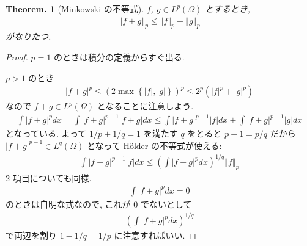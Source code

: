 \documentclass[openany, a4paper, oneside]{jsbook}
\theoremstyle{break}
\newtheorem{thm}{Theorem.}[section]
\theoremstyle{breakdefn}
\newcommand{\abs}[1]{\left|#1\right|}
\newcommand{\norm}[1]{\left\Vert#1\right\Vert}
\newcommand{\rbk}[1]{\left (#1\right)}
\newcommand{\cbk}[1]{\left\{#1\right\}}
\begin{document}
\begin{thm}[Minkowski の不等式]
 $f$, $g \in L^p(\Omega)$ とするとき,
 \begin{align}
  \norm{f + g}_p
  \leq
  \norm{f}_p + \norm{g}_p
 \end{align}
 がなりたつ.
\end{thm}
\begin{proof}
$p=1$ のときは積分の定義からすぐ出る.

$p > 1$ のとき
\begin{align}
 \abs{f + g}^p
 \le
 \rbk{2 \max \cbk{\abs{f}, \abs{g}}}^p
 \le
 2^p \rbk{\abs{f}^p + \abs{g}^p}
\end{align}
なので $f + g \in L^p(\Omega)$ となることに注意しよう.
\begin{align}
 \int \abs{f + g}^p dx
 =
 \int \abs{f + g}^{p-1} \abs{f + g} dx
 \le
 \int \abs{f + g}^{p-1} \abs{f}dx + \int \abs{f + g}^{p-1} \abs{g} dx
\end{align}
となっている.
よって $1/p + 1/q = 1$ を満たす $q$ をとると $p-1 = p/q$ だから
$\abs{f + g}^{p-1} \in L^q (\Omega)$ となって H\"older の不等式が使える:
\begin{align}
 \int \abs{f + g}^{p-1} \abs{f} dx
 \le
 \rbk{\int \abs{f + g}^p dx}^{1/q} \norm{f}_p
\end{align}
2 項目についても同様.
\begin{align}
 \int \abs{f + g}^p dx
 =
 0
\end{align}
のときは自明な式なので, これが $0$ でないとして
\begin{align}
 \rbk{\int \abs{f + g}^p dx}^{1/q}
\end{align}
で両辺を割り $1-1/q = 1/p$ に注意すればいい.
\end{proof}
\end{document}
